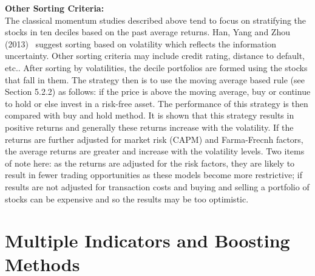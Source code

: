 \noindent \textbf{Other Sorting Criteria:} \\

The classical momentum studies described above tend to focus on stratifying the stocks in ten deciles based on the past average returns. Han, Yang and Zhou (2013)~\cite{hanyangzhou} suggest sorting based on volatility which reflects the information uncertainty. Other sorting criteria may include credit rating, distance to default, etc.. After sorting by volatilities, the decile portfolios are formed using the stocks that fall in them. The strategy then is to use the moving average based rule (see Section 5.2.2) as follows: if the price is above the moving average, buy or continue to hold or else invest in a risk-free asset. The performance of this strategy is then compared with buy and hold method. It is shown that this strategy results in positive returns and generally these returns increase with the volatility. If the returns are further adjusted for market risk (CAPM) and Farma-Frecnh factors, the average returns are greater and increase with the volatility levels. Two items of note here: as the returns are adjusted for the risk factors, they are likely to result in fewer trading opportunities as these models become more restrictive; if results are not adjusted for transaction costs and buying and selling a portfolio of stocks can be expensive and so the results may be too optimistic.  









\section{Multiple Indicators and Boosting Methods}


